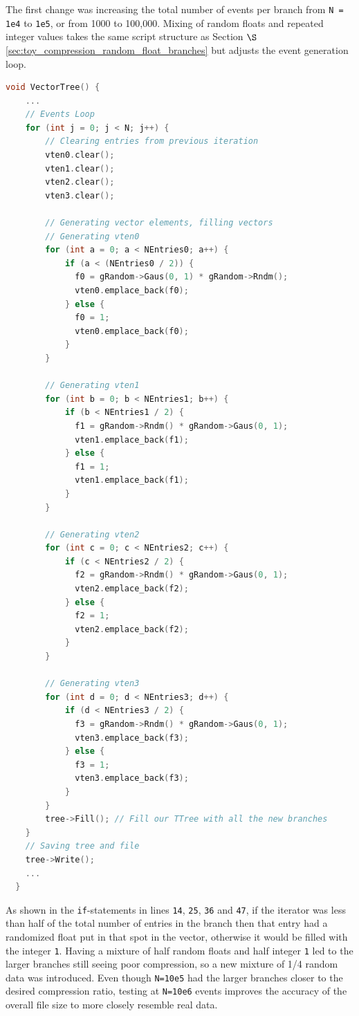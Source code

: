 The first change was increasing the total number of events per branch from \verb|N = 1e4| to \verb|1e5|, or from 1000 to 100,000. 
Mixing of random floats and repeated integer values takes the same script structure as Section $\S$ \ref{sec:toy_compression_random_float_branches} but adjusts the event generation loop.
\begin{lstlisting}[language=C]  
  void VectorTree() {
    ...
    // Events Loop
    for (int j = 0; j < N; j++) {
        // Clearing entries from previous iteration
        vten0.clear();
        vten1.clear();
        vten2.clear();
        vten3.clear();

        // Generating vector elements, filling vectors
        // Generating vten0
        for (int a = 0; a < NEntries0; a++) {
            if (a < (NEntries0 / 2)) {
              f0 = gRandom->Gaus(0, 1) * gRandom->Rndm();
              vten0.emplace_back(f0);
            } else {
              f0 = 1; 
              vten0.emplace_back(f0);
            }
        }

        // Generating vten1
        for (int b = 0; b < NEntries1; b++) {
            if (b < NEntries1 / 2) {
              f1 = gRandom->Rndm() * gRandom->Gaus(0, 1);
              vten1.emplace_back(f1);
            } else {
              f1 = 1;
              vten1.emplace_back(f1);
            }
        }

        // Generating vten2
        for (int c = 0; c < NEntries2; c++) {
            if (c < NEntries2 / 2) {
              f2 = gRandom->Rndm() * gRandom->Gaus(0, 1);
              vten2.emplace_back(f2);
            } else {
              f2 = 1;
              vten2.emplace_back(f2);
            }
        }

        // Generating vten3
        for (int d = 0; d < NEntries3; d++) {
            if (d < NEntries3 / 2) {
              f3 = gRandom->Rndm() * gRandom->Gaus(0, 1);
              vten3.emplace_back(f3);
            } else {
              f3 = 1;
              vten3.emplace_back(f3);
            }
        }
        tree->Fill(); // Fill our TTree with all the new branches
    }
    // Saving tree and file
    tree->Write();
    ...
  }
\end{lstlisting}

As shown in the \verb|if|-statements in lines \verb|14|, \verb|25|, \verb|36| and \verb|47|, if the iterator was less than half of the total number of entries in the branch then that entry had a randomized float put in that spot in the vector, otherwise it would be filled with the integer \verb|1|.
Having a mixture of half random floats and half integer \verb|1| led to the larger branches still seeing poor compression, so a new mixture of 1/4 random data was introduced. 
Even though \verb|N=10e5| had the larger branches closer to the desired compression ratio, testing at \verb|N=10e6| events improves the accuracy of the overall file size to more closely resemble real data.

